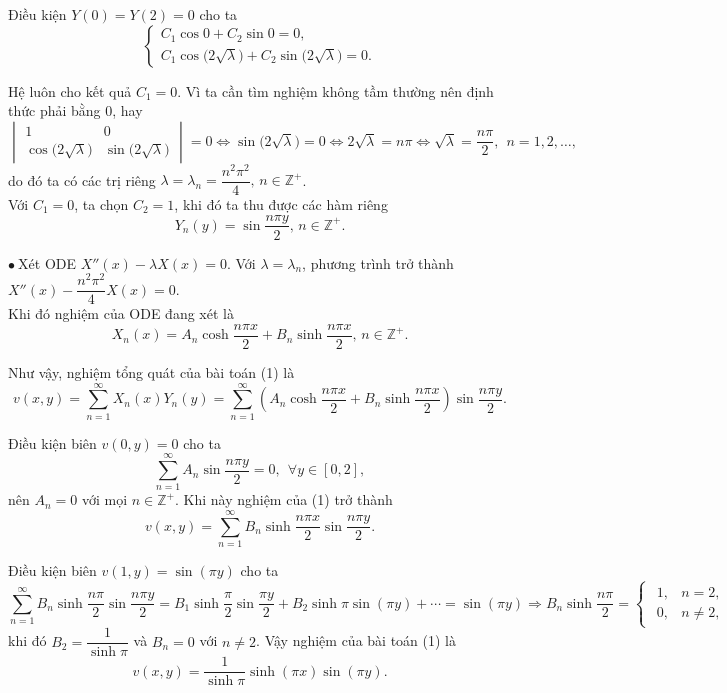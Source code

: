 \documentclass[10pt, a4paper]{article}
\begin{document}
	Điều kiện $Y(0)=Y(2)=0$ cho ta $$\begin{cases}
		C_1\cos0+C_2\sin0=0,\\
		C_1\cos\big(2\sqrt\lambda\big)+C_2\sin\big(2\sqrt\lambda\big)=0.
	\end{cases}$$
	
	Hệ luôn cho kết quả $C_1=0$. Vì ta cần tìm nghiệm không tầm thường nên định thức phải bằng 0, hay $$\begin{vmatrix}
		1&0\\
		\cos\big(2\sqrt\lambda\big)&\sin\big(2\sqrt\lambda\big)
	\end{vmatrix}=0\iff\sin\big(2\sqrt\lambda\big)=0\iff2\sqrt\lambda=n\pi\iff\sqrt\lambda=\frac{n\pi}{2},~~n=1,2,\ldots,$$
	do đó ta có các trị riêng $\lambda=\lambda_n=\dfrac{n^2\pi^2}{4},\,n\in\mathbb Z^+$.\\
	
	Với $C_1=0$, ta chọn $C_2=1$, khi đó ta thu được các hàm riêng $$Y_n(y)=\sin\frac{n\pi y}{2},\,n\in\mathbb Z^+.$$
	
	$\bullet~$Xét ODE $X''(x)-\lambda X(x)=0$. Với $\lambda=\lambda_n$, phương trình trở thành $X''(x)-\dfrac{n^2\pi^2}{4}X(x)=0$.\\
	
	Khi đó nghiệm của ODE đang xét là $$X_n(x)=A_n\cosh\frac{n\pi x}{2}+B_n\sinh\frac{n\pi x}{2},\,n\in\mathbb Z^+.$$
	
	Như vậy, nghiệm tổng quát của bài toán (1) là $$v(x,y)=\sum_{n=1}^\infty X_n(x)Y_n(y)=\sum_{n=1}^\infty\left(A_n\cosh\frac{n\pi x}{2}+B_n\sinh\frac{n\pi x}{2}\right)\sin\frac{n\pi y}{2}.$$
	
	Điều kiện biên $v(0,y)=0$ cho ta $$\sum_{n=1}^\infty A_n\sin\frac{n\pi y}{2}=0,~~\forall y\in[0,2],$$
	nên $A_n=0$ với mọi $n\in\mathbb Z^+$. Khi này nghiệm của (1) trở thành $$v(x,y)=\sum_{n=1}^\infty B_n\sinh\frac{n\pi x}{2}\sin\frac{n\pi y}{2}.$$
	
	Điều kiện biên $v(1,y)=\sin(\pi y)$ cho ta $$\sum_{n=1}^\infty B_n\sinh\frac{n\pi}{2}\sin\frac{n\pi y}{2}=B_1\sinh\frac\pi2\sin\frac{\pi y}{2}+B_2\sinh\pi\sin(\pi y)+\cdots=\sin(\pi y)\Rightarrow B_n\sinh\frac{n\pi}{2}=\begin{cases}
		\begin{array}{ll}
			1, & n=2, \\
			0, & n\ne2,
		\end{array}
	\end{cases}$$
	khi đó $B_2=\dfrac{1}{\sinh\pi}$ và $B_n=0$ với $n\ne2$. Vậy nghiệm của bài toán (1) là $$v(x,y)=\frac{1}{\sinh\pi}\sinh(\pi x)\sin(\pi y).$$
	
\end{document}
